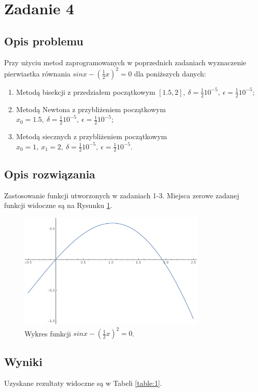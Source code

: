 \documentclass{classrep}
\begin{document}
\section{Zadanie 4}
	\subsection{Opis problemu}
		Przy użyciu metod zaprogramowanych w poprzednich zadaniach wyznaczenie pierwiastka równania $sin{x}-(\frac{1}{2}x)^2=0$ dla poniższych danych:
		\begin{enumerate}[1.]
			\item Metodą bisekcji z przedziałem początkowym $[1.5,2],~\delta=\frac{1}{2}10^{-5},~\epsilon=\frac{1}{2}10^{-5}$;
			\item Metodą Newtona z przybliżeniem początkowym $x_0=1.5,~\delta=\frac{1}{2}10^{-5},~\epsilon=\frac{1}{2}10^{-5}$;
			\item Metodą siecznych z przybliżeniem początkowym $x_0=1,~x_1=2,~\delta=\frac{1}{2}10^{-5},~\epsilon=\frac{1}{2}10^{-5}$.
		\end{enumerate}
		
	\subsection{Opis rozwiązania}
		Zastosowanie funkcji utworzonych w zadaniach 1-3.
		Miejsca zerowe zadanej funkcji widoczne są na Rysunku \ref{fig:3}.
		
		\begin{figure}[!htbp]
			\centering
			\includegraphics[width=0.8\textwidth]{zadania/plot41.png}
  			\caption{Wykres funkcji $sin{x}-(\frac{1}{2}x)^2=0$.}
  			\label{fig:3}
		\end{figure}	
		
	
	\subsection{Wyniki}
		Uzyskane rezultaty widoczne są w Tabeli \ref{table:1}.
		
\end{document}
